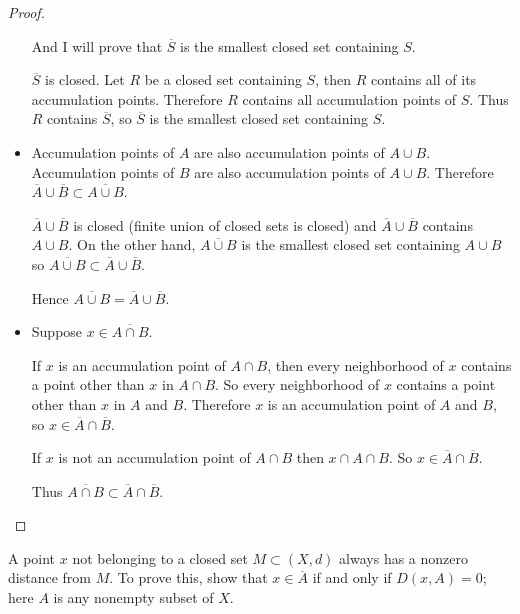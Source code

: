 \begin{proof}
\begin{itemize}
              And I will prove that $\overline{S}$ is the smallest closed set containing $S$.

              $\overline{S}$ is closed. Let $R$ be a closed set containing $S$, then $R$ contains all of its accumulation points. Therefore $R$ contains all accumulation points of $S$. Thus $R$ contains $\overline{S}$, so $\overline{S}$ is the smallest closed set containing $S$.
        \item Accumulation points of $A$ are also accumulation points of $A\cup B$. Accumulation points of $B$ are also accumulation points of $A\cup B$. Therefore $\overline{A}\cup \overline{B}\subset \overline{A\cup B}$.

              $\overline{A}\cup \overline{B}$ is closed (finite union of closed sets is closed) and $\overline{A}\cup \overline{B}$ contains $A\cup B$. On the other hand, $\overline{A\cup B}$ is the smallest closed set containing $A\cup B$ so $\overline{A\cup B}\subset \overline{A}\cup \overline{B}$.

              Hence $\overline{A\cup B} = \overline{A}\cup \overline{B}$.
        \item Suppose $x\in \overline{A\cap B}$.

              If $x$ is an accumulation point of $A\cap B$, then every neighborhood of $x$ contains a point other than $x$ in $A\cap B$. So every neighborhood of $x$ contains a point other than $x$ in $A$ and $B$. Therefore $x$ is an accumulation point of $A$ and $B$, so $x\in \overline{A}\cap\overline{B}$.

              If $x$ is not an accumulation point of $A\cap B$ then $x\cap A\cap B$. So $x\in \overline{A}\cap \overline{B}$.

              Thus $\overline{A\cap B}\subset \overline{A}\cap\overline{B}$.
    \end{itemize}
\end{proof}

\begin{exercise}\label{chapter1:section3:exercise10}
    A point $x$ not belonging to a closed set $M\subset (X, d)$ always has a nonzero distance from $M$. To prove this, show that $x\in \overline{A}$ if and only if $D(x, A) = 0$; here $A$ is any nonempty subset of $X$.
\end{exercise}

